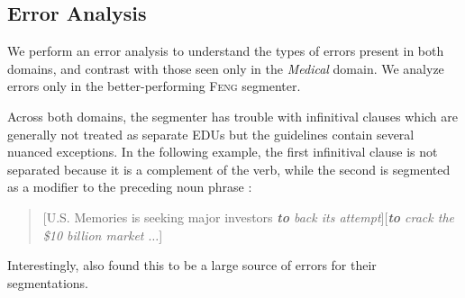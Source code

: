 \subsection{Error Analysis}
We perform an error analysis to understand the types of errors present in both domains, and contrast with those seen only in the \textit{Medical} domain. We analyze errors only in the better-performing \textsc{Feng} segmenter.

Across both domains, the segmenter has trouble with infinitival clauses which are generally not treated as separate EDUs but the guidelines contain several nuanced exceptions. In the following example, the first infinitival clause is not separated because it is a complement of the verb, while the second is segmented as a modifier to the preceding noun phrase : 
\begin{quote}
[U.S. Memories is seeking major investors \textit{\textbf{to} back its attempt}][\textit{\textbf{to} crack the \$10 billion market $\ldots$}]
\end{quote}
Interestingly,  also found this to  be a large source of errors for their segmentations. 

